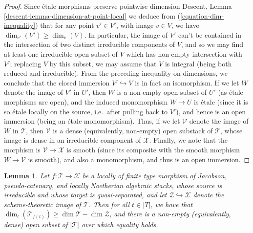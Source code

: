 \documentclass{stacks-project}
\theoremstyle{plain}
\newtheorem{lemma}[subsection]{Lemma}
\theoremstyle{definition}
\theoremstyle{remark}
\numberwithin{equation}{subsection}
\begin{document}
\begin{proof}
\medskip\noindent
Since \'etale morphisms preserve pointwise dimension
Descent, Lemma \ref{descent-lemma-dimension-at-point-local}
we deduce from (\ref{equation-dim-inequality})
that for any point $v' \in V'$,
with image $v \in V$, we have
$\dim_{v'}( V') \geq \dim_v(V)$.
In particular, the image of $V'$ can't be contained in the intersection
of two distinct irreducible components of $V$, and so we may find
at least one irreducible open subset of $V$ which has non-empty intersection
with $V'$; replacing $V$ by this subset, we may assume that $V$ is integral
(being both reduced and irreducible).  From the preceding inequality
on dimensions, we conclude that the closed immersion $V' \hookrightarrow V$
is in fact an isomorphism.
If we let $W$ denote the image of $V'$
in $U'$, then $W$ is a non-empty
open subset of $U'$ (as \'etale morphisms are open),
and the induced monomorphism $W \to U$ is \'etale
(since it is so \'etale locally on the source, i.e.\ after pulling back
to $V'$), and hence is an open immersion (being an \'etale monomorphism).
Thus, if we let $\mathcal{V}$ denote the image of $W$ in $\mathcal{T}$,
then $\mathcal{V}$ is a dense (equivalently, non-empty) open substack of
$\mathcal{T}$,
whose image is dense in an irreducible component of $\mathcal{X}$.
Finally,
we note that the morphism is $\mathcal{V} \to \mathcal{X}$ is smooth
(since its composite
with the smooth morphism $W\to \mathcal{V}$ is smooth),
and also a monomorphism, and thus is an open immersion.
\end{proof}

\begin{lemma}
\label{lemma-dims-of-images}
Let $f: \mathcal{T} \to \mathcal{X}$ be a locally of finite type
morphism of Jacobson, pseudo-catenary, and locally Noetherian
algebraic stacks,
whose source is irreducible and whose target is quasi-separated,
and let $\mathcal{Z} \hookrightarrow \mathcal{X}$ denote the scheme-theoretic
image of $\mathcal{T}$.
Then for all $t \in |T|$,
we have that
$\dim_t( \mathcal{T}_{f(t)}) \geq \dim \mathcal{T}  - \dim \mathcal{Z}$,
and there is a non-empty (equivalently, dense)
open subset of $|\mathcal{T}|$ over which equality holds.
\end{lemma}
\end{document}
